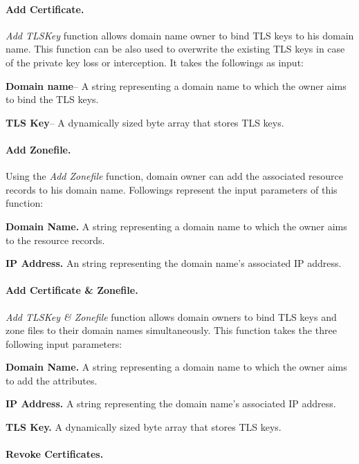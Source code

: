 \paragraph{Add Certificate.}

\emph{Add TLSKey} function allows domain name owner to bind TLS keys to his domain name. This function can be also used to overwrite the existing TLS keys in case of the private key loss or interception. It takes the followings as input: \par
\textbf{Domain name}-- A string representing a domain name to which the owner aims to bind the TLS keys. \par
\textbf{TLS Key}-- A dynamically sized byte array that stores TLS keys.

\paragraph{Add Zonefile.}
 
Using the \emph{Add Zonefile} function, domain owner can add the associated resource records to his domain name. Followings represent the input parameters of this function: \par
\textbf{Domain Name.} A string representing a domain name to which the owner aims to the resource records. \par
\textbf{IP Address.} An string representing the domain name's associated IP address.

\paragraph{Add Certificate \& Zonefile.}

\emph{Add TLSKey \& Zonefile} function allows domain owners to bind TLS keys and zone files to their domain names simultaneously. This function takes the three following input parameters: \par
\textbf{Domain Name.} A string representing a domain name to which the owner aims to add the attributes.\par
\textbf{IP Address.} A string representing the domain name's associated IP address.\par
\textbf{TLS Key.} A dynamically sized byte array that stores TLS keys.

\paragraph{Revoke Certificates.}

